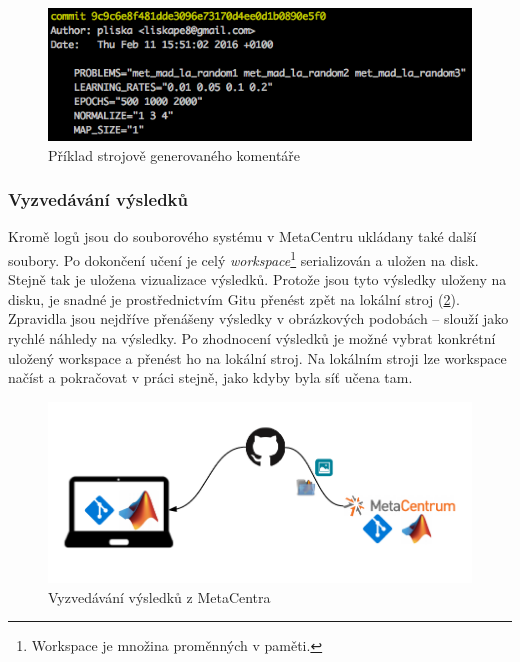 \documentclass[thesis=M,czech]{FITthesis}[2012/06/26]
\begin{document}
\begin{figure}[htbp]
\begin{center}
	\includegraphics[scale=0.7]{semantic_commit}
\caption{Příklad strojově generovaného komentáře}
\label{fig:semantic_commit}
\end{center}
\end{figure}



\subsubsection*{Vyzvedávání výsledků}
Kromě logů jsou do souborového systému v MetaCentru ukládany také další soubory. Po dokončení učení je celý \textit{workspace}\footnote{Workspace je množina proměnných v paměti.} serializován a uložen na disk. Stejně tak je uložena vizualizace výsledků. Protože jsou tyto výsledky uloženy na disku, je snadné je prostřednictvím Gitu přenést zpět na lokální stroj (\ref{fig:down}). Zpravidla jsou nejdříve přenášeny výsledky v obrázkových podobách -- slouží jako rychlé náhledy na výsledky. Po zhodnocení výsledků je možné vybrat konkrétní uložený workspace a přenést ho na lokální stroj. Na lokálním stroji lze workspace načíst a pokračovat v práci stejně, jako kdyby byla síť učena tam.

\begin{figure}[htbp]
\begin{center}
	\includegraphics[scale=0.9]{down.png}
\caption{Vyzvedávání výsledků z MetaCentra}
\label{fig:down}
\end{center}
\end{figure}
\end{document}

